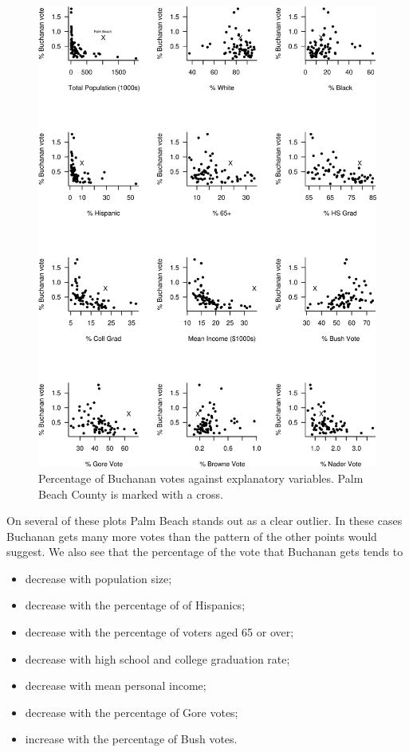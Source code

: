 \documentclass[
  british,
]{book}
\providecommand{\tightlist}{%
  \setlength{\itemsep}{0pt}\setlength{\parskip}{0pt}}
\begin{document}
\begin{figure}

{\centering \includegraphics[width=0.8\linewidth]{images/election1} 

}

\caption{ Percentage of Buchanan votes against explanatory variables.  Palm Beach County is marked with a cross.}\label{fig:election1}
\end{figure}
\FloatBarrier

On several of these plots Palm Beach stands out as a clear outlier. In these cases Buchanan gets many more votes than the pattern of the other points would suggest. We also see that the percentage of the vote that Buchanan gets tends to

\begin{itemize}
\tightlist
\item
  decrease with population size;
\item
  decrease with the percentage of of Hispanics;
\item
  decrease with the percentage of voters aged 65 or over;
\item
  decrease with high school and college graduation rate;
\item
  decrease with mean personal income;
\item
  decrease with the percentage of Gore votes;
\item
  increase with the percentage of Bush votes.
\end{itemize}
\end{document}
